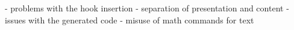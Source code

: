 \documentclass{article}
\begin{document}
\begin{markdown}
- problems with the hook insertion
  - separation of presentation and content
- issues with the generated code
  - misuse of math commands for text 
\end{markdown}
\end{document}
